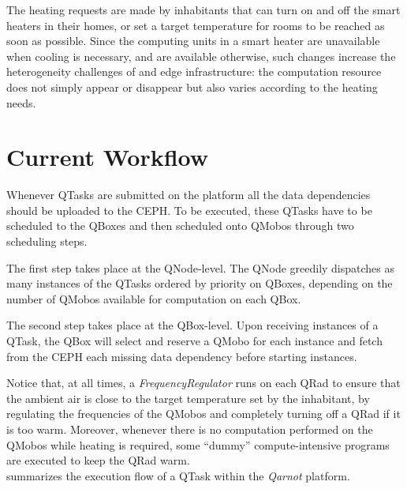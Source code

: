 The heating requests are made by inhabitants that can turn on and off the smart heaters in their homes, or set a target temperature for rooms to be reached as soon as possible.
Since the computing units in a smart heater are unavailable when cooling is necessary, and are available otherwise, such changes increase the heterogeneity challenges of and edge infrastructure: the computation resource does not simply appear  or disappear but also varies according to the heating needs. 

\section{Current Workflow}\label{ssec:qarnot-sched}

Whenever QTasks are submitted on the platform all the data dependencies should be uploaded to the CEPH.
To be executed, these QTasks have to be scheduled to the QBoxes and then scheduled onto QMobos through two scheduling steps.

The first step takes place at the QNode-level.
The QNode greedily dispatches as many instances of the QTasks ordered by priority on QBoxes, depending on the number of QMobos available for computation on each QBox.

The second step takes place at the QBox-level.
Upon receiving instances of a QTask, the QBox will select and reserve a QMobo for each instance and fetch from the CEPH each missing data dependency before starting instances.

Notice that, at all times, a \emph{FrequencyRegulator} runs on each QRad to ensure that the ambient air is close to the target temperature set by the inhabitant, by regulating the frequencies of the QMobos and completely turning off a QRad if it is too warm.
Moreover, whenever there is no computation performed on the QMobos while heating is required, some ``dummy'' compute-intensive programs are executed to keep the QRad warm. \\

 summarizes the execution flow of a QTask within the \emph{Qarnot} platform.

